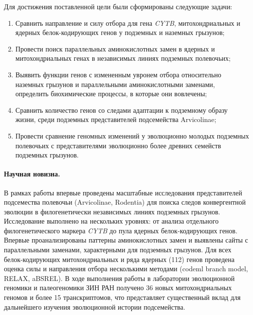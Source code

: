 Для достижения поставленной цели были сформированы следующие задачи:
\begin{enumerate}
	\item Сравнить направление и силу отбора для гена \textit{CYTB}, митохондриальных и ядерных белок-кодирующих генов у подземных и наземных грызунов;
	\item Провести поиск параллельных аминокислотных замен в ядерных и митохондриальных генах в независимых линиях подземных полевочьих;
	\item Выявить функции генов с измененным увронем отбора относительно наземных грызунов и параллельными аминокислотными заменами, определить биохимические процессы, в которые они вовлечены;
	\item Сравнить количество генов со следами адаптации к подземному образу жизни, среди подземных представителей подсемейства Arvicolinae;
	\item Провести сравнение геномных изменений у эволюционно молодых подземных полевочьих с представителями эволюционно более древних семейств подземных грызунов. 
\end{enumerate}

\paragraph{Научная новизна.} В рамках работы впервые проведены масштабные исследования представителей подсемества полевочьи (Arvicolinae, Rodentia) для поиска следов конвергентной эволюции в филогенетически независимых линиях подземных грызунов. Исследование выполнено на нескольких уровнях: от анализа отдельного филогенетического маркера \textit{CYTB} до пула ядерных белок-кодирующих генов. Впервые проанализированы паттерны аминокислотных замен и выявлены сайты с параллельными заменами, характерными для подземных грызунов. Для всех белок-кодирующих митохондриальных и ряда ядерных (112) генов проведена оценка силы и направления отбора несколькими методами (codeml branch model, RELAX, aBSREL). В ходе выполнения работы в лаборатории эволюционной геномики и палеогеномики ЗИН РАН получено 36 новых митохондриальных геномов и более 15 транскриптомов, что представляет существенный вклад для дальнейшего изучения эволюционной истории подсемейства. 

